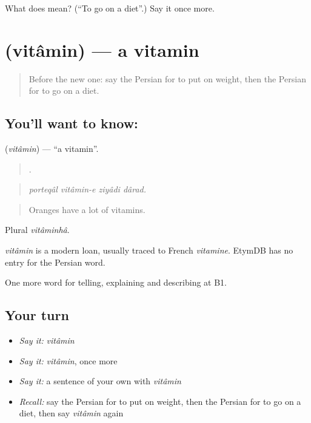 \begin{tcolorbox}[breakable,colback=teal!4,colframe=teal!35!black,title={Before you move on}]
What does   mean? (\textquotedblleft{}To go on a diet\textquotedblright{}.) Say it once more.
\end{tcolorbox}
\section[\texorpdfstring{\fa{ویتامین} (vitâmin)}{ویتامین (vitâmin)}]{ (vitâmin) — a vitamin}

\label{lesson:FA-C498-vitamin}



\begin{quote}
Before the new one: say the Persian for to put on weight, then the Persian for to go on a diet.
\end{quote}

\subsection*{You'll want to know: }
\textbf{} (\emph{vitâmin}) — \textquotedblleft{}a vitamin\textquotedblright{}.

\begin{quote}
   .
\end{quote}

\begin{quote}
\emph{porteqâl vitâmin-e ziyâdi dârad.}
\end{quote}

\begin{quote}
Oranges have a lot of vitamins.
\end{quote}

Plural \emph{vitâminhâ}.

\begin{cousinweb}
\emph{vitâmin} is a modern loan, usually traced to French \emph{vitamine}. EtymDB has no entry for the Persian word.
\end{cousinweb}

\begin{grammarlens}[title={What you've built}]
One more word for telling, explaining and describing at B1.
\end{grammarlens}

\subsection*{Your turn}
\begin{itemize}
\raggedright
  \item \emph{Say it:} \emph{vitâmin}
  \item \emph{Say it:} \emph{vitâmin}, once more
  \item \emph{Say it:} a sentence of your own with \emph{vitâmin}
  \item \emph{Recall:} say the Persian for to put on weight, then the Persian for to go on a diet, then say \emph{vitâmin} again
\end{itemize}

